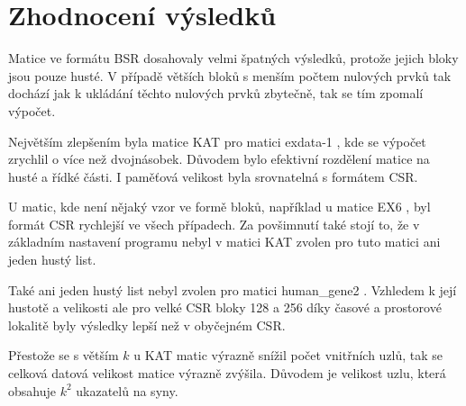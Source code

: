 \section{Zhodnocení výsledků}

Matice ve formátu BSR dosahovaly velmi špatných výsledků, protože	 jejich bloky jsou pouze husté. V případě větších bloků s menším počtem nulových prvků tak dochází jak k ukládání těchto nulových prvků zbytečně, tak se tím zpomalí výpočet.

Největším zlepšením byla matice KAT pro matici exdata-1 \cite{mtxexdata}, kde se výpočet zrychlil o více než dvojnásobek. Důvodem bylo efektivní rozdělení matice na husté a řídké části. I paměťová velikost byla srovnatelná s formátem CSR.

U matic, kde není nějaký vzor ve formě bloků, například u matice EX6 \cite{mtxex}, byl formát CSR rychlejší ve všech případech. Za  povšimnutí také stojí to, že v základním nastavení programu nebyl v matici KAT zvolen pro tuto matici ani jeden hustý list.

Také ani jeden hustý list nebyl zvolen pro matici human\_gene2 \cite{mtxhuman}. Vzhledem k její hustotě a velikosti ale pro velké CSR bloky 128 a 256 díky časové a prostorové lokalitě \cite{cachelocal} byly výsledky lepší než v obyčejném CSR.

Přestože se s větším $k$ u KAT matic výrazně snížil počet vnitřních uzlů, tak se celková datová velikost matice výrazně zvýšila. Důvodem je velikost uzlu, která obsahuje $k^2$ ukazatelů na syny. 
